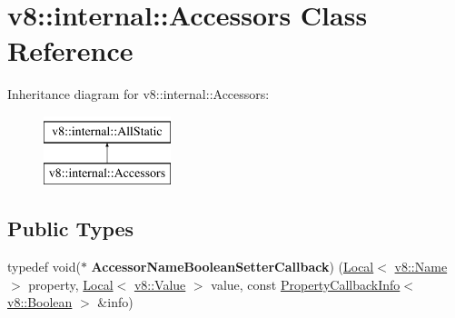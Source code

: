 \hypertarget{classv8_1_1internal_1_1Accessors}{}\section{v8\+:\+:internal\+:\+:Accessors Class Reference}
\label{classv8_1_1internal_1_1Accessors}
Inheritance diagram for v8\+:\+:internal\+:\+:Accessors\+:\begin{figure}[H]
\begin{center}
\leavevmode
\includegraphics[height=2.000000cm]{classv8_1_1internal_1_1Accessors}
\end{center}
\end{figure}
\subsection*{Public Types}
\begin{DoxyCompactItemize}
\item 
\mbox{\label{classv8_1_1internal_1_1Accessors_ab8bf583e163e3f06c3ab30d0b8049d90}} 
typedef void($\ast$ {\bfseries Accessor\+Name\+Boolean\+Setter\+Callback}) (\mbox{\hyperlink{classv8_1_1Local}{Local}}$<$ \mbox{\hyperlink{classv8_1_1Name}{v8\+::\+Name}} $>$ property, \mbox{\hyperlink{classv8_1_1Local}{Local}}$<$ \mbox{\hyperlink{classv8_1_1Value}{v8\+::\+Value}} $>$ value, const \mbox{\hyperlink{classv8_1_1PropertyCallbackInfo}{Property\+Callback\+Info}}$<$ \mbox{\hyperlink{classv8_1_1Boolean}{v8\+::\+Boolean}} $>$ \&info)
\end{DoxyCompactItemize}
